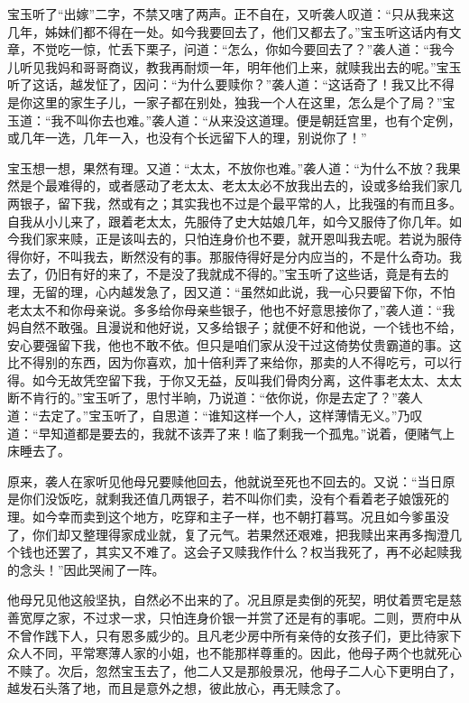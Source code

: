 \documentclass[12pt,oneside]{book}
\begin{document}
宝玉听了“出嫁”二字，不禁又嗐了两声。正不自在，又听袭人叹道：“只从我来这几年，姊妹们都不得在一处。如今我要回去了，他们又都去了。”宝玉听这话内有文章，不觉吃一惊，忙丢下栗子，问道：“怎么，你如今要回去了？”袭人道：“我今儿听见我妈和哥哥商议，教我再耐烦一年，明年他们上来，就赎我出去的呢。”宝玉听了这话，越发怔了，因问：“为什么要赎你？”袭人道：“这话奇了！我又比不得是你这里的家生子儿，一家子都在别处，独我一个人在这里，怎么是个了局？”宝玉道：“我不叫你去也难。”袭人道：“从来没这道理。便是朝廷宫里，也有个定例，或几年一选，几年一入，也没有个长远留下人的理，别说你了！”

宝玉想一想，果然有理。又道：“太太，不放你也难。”袭人道：“为什么不放？我果然是个最难得的，或者感动了老太太、老太太必不放我出去的，设或多给我们家几两银子，留下我，然或有之；其实我也不过是个最平常的人，比我强的有而且多。自我从小儿来了，跟着老太太，先服侍了史大姑娘几年，如今又服侍了你几年。如今我们家来赎，正是该叫去的，只怕连身价也不要，就开恩叫我去呢。若说为服侍得你好，不叫我去，断然没有的事。那服侍得好是分内应当的，不是什么奇功。我去了，仍旧有好的来了，不是没了我就成不得的。”宝玉听了这些话，竟是有去的理，无留的理，心内越发急了，因又道：“虽然如此说，我一心只要留下你，不怕老太太不和你母亲说。多多给你母亲些银子，他也不好意思接你了，”袭人道：“我妈自然不敢强。且漫说和他好说，又多给银子；就便不好和他说，一个钱也不给，安心要强留下我，他也不敢不依。但只是咱们家从没干过这倚势仗贵霸道的事。这比不得别的东西，因为你喜欢，加十倍利弄了来给你，那卖的人不得吃亏，可以行得。如今无故凭空留下我，于你又无益，反叫我们骨肉分离，这件事老太太、太太断不肯行的。”宝玉听了，思忖半晌，乃说道：“依你说，你是去定了？”袭人道：“去定了。”宝玉听了，自思道：“谁知这样一个人，这样薄情无义。”乃叹道：“早知道都是要去的，我就不该弄了来！临了剩我一个孤鬼。”说着，便赌气上床睡去了。

原来，袭人在家听见他母兄要赎他回去，他就说至死也不回去的。又说：“当日原是你们没饭吃，就剩我还值几两银子，若不叫你们卖，没有个看着老子娘饿死的理。如今幸而卖到这个地方，吃穿和主子一样，也不朝打暮骂。况且如今爹虽没了，你们却又整理得家成业就，复了元气。若果然还艰难，把我赎出来再多掏澄几个钱也还罢了，其实又不难了。这会子又赎我作什么？权当我死了，再不必起赎我的念头！”因此哭闹了一阵。

他母兄见他这般坚执，自然必不出来的了。况且原是卖倒的死契，明仗着贾宅是慈善宽厚之家，不过求一求，只怕连身价银一并赏了还是有的事呢。二则，贾府中从不曾作践下人，只有恩多威少的。且凡老少房中所有亲侍的女孩子们，更比待家下众人不同，平常寒薄人家的小姐，也不能那样尊重的。因此，他母子两个也就死心不赎了。次后，忽然宝玉去了，他二人又是那般景况，他母子二人心下更明白了，越发石头落了地，而且是意外之想，彼此放心，再无赎念了。
\end{document}
